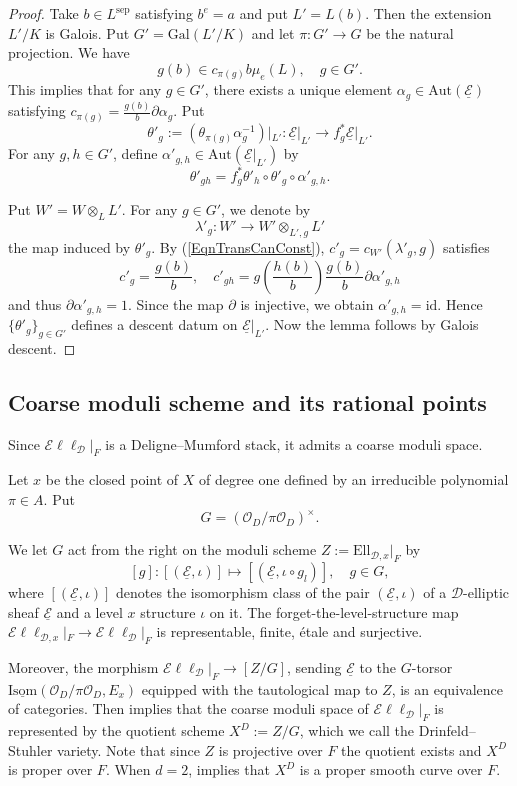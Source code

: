 \documentclass[10pt]{amsart}
\theoremstyle{plain}
\theoremstyle{definition}
\newcommand{\Aut}{\mathrm{Aut}}
\newcommand{\Gal}{\mathrm{Gal}}
\newcommand{\id}{\mathrm{id}}
\newcommand{\Isom}{\mathrm{Isom}}
\newcommand{\sep}{\mathrm{sep}}
\newcommand{\cO}{\mathcal{O}}
\newcommand{\sEll}{\mathscr{E}\ell\ell}
\newcommand{\Ell}{\mathrm{Ell}}
\newcommand{\ucE}{\underline{\mathcal{E}}}
\newcommand{\sD}{\mathscr{D}}
\begin{document}
\begin{proof}
	Take $b\in L^\sep$ satisfying $b^e=a$ and put $L'=L(b)$. Then the extension $L'/K$ is Galois.
	Put $G'=\Gal(L'/K)$ and let $\pi: G'\to G$ be the natural projection. We have
	\[
		g(b)\in c_{\pi(g)} b \mu_e(L),\quad g\in G'.
	\]
	This implies that for any $g\in G'$, there exists a unique element $\alpha_g\in \Aut(\ucE)$ satisfying
	$c_{\pi(g)}=\frac{g(b)}{b}\partial\alpha_g$. Put
	\[
	\theta'_g:=(\theta_{\pi(g)}\alpha_g^{-1})|_{L'}:\ucE|_{L'}\to f_{g}^*\ucE|_{L'}.
	\]
	For any $g,h\in G'$, define $\alpha'_{g,h}\in \Aut(\ucE|_{L'})$ by
	\[
	\theta'_{gh}=f_g^*\theta'_h\circ \theta'_g\circ \alpha'_{g,h}.
	\]
	
	Put $W'=W\otimes_L L'$. For any $g\in G'$, we denote by
	\[
	\lambda'_g:W'\to W'\otimes_{L',g}L'
	\]
	the map induced by $\theta'_g$. By (\ref{EqnTransCanConst}), $c'_g=c_{W'}(\lambda'_g,g)$ satisfies
	\[
	c'_g=\frac{g(b)}{b},\quad c'_{gh}=g\left(\frac{h(b)}{b}\right)\frac{g(b)}{b}\partial \alpha'_{g,h}
	\]
	and thus $\partial \alpha'_{g,h}=1$. Since the map $\partial$ is injective, we obtain $\alpha'_{g,h}=\id$.
	Hence $\{\theta'_g\}_{g\in G'}$ defines a descent datum on $\ucE|_{L'}$.
	Now the lemma follows by Galois descent.
\end{proof}

\subsection{Coarse moduli scheme and its rational points}\label{SubsecCoarseModuli}

Since $\sEll_{\sD}|_F$ is a Deligne--Mumford stack, it admits a coarse moduli space. 

Let $x$ be the closed point of $X$ of degree one 
defined by an irreducible polynomial $\pi\in A$. Put 
\[
G=(\cO_D/\pi\cO_D)^\times. 
\]

We let $G$ act from the right on the moduli scheme
$Z:=\Ell_{\sD,x}|_F$ by 
\[
[g]:[(\ucE,\iota)]\mapsto [(\ucE,\iota\circ g_l)],\quad g\in G,
\]
where $[(\ucE,\iota)]$ denotes the isomorphism class of the pair $(\ucE,\iota)$
of a $\sD$-elliptic sheaf $\ucE$ and a level $x$ structure $\iota$ on it.
The forget-the-level-structure map $\sEll_{\sD,x}|_F\to \sEll_{\sD}|_F$ is representable, finite, \'{e}tale and surjective. 

Moreover, the morphism $\sEll_{\sD}|_F\to [Z/G]$, sending $\ucE$ to the $G$-torsor $\underline{\Isom}(\cO_D/\pi\cO_D,E_x)$ equipped with the tautological
map to $Z$, is an equivalence of categories.
Then \cite[Ch.~I, (8.2.2)]{DeRa} implies that the coarse moduli space of $\sEll_{\sD}|_F$ is represented by the quotient scheme $X^D:=Z/G$,
which we call the Drinfeld--Stuhler variety. 
Note that since $Z$ is projective over $F$ the quotient exists and $X^D$ is proper over $F$.
When $d=2$, \cite[p.~508, Theorem]{KM} implies that $X^D$ is a proper smooth curve over $F$.
\end{document}
